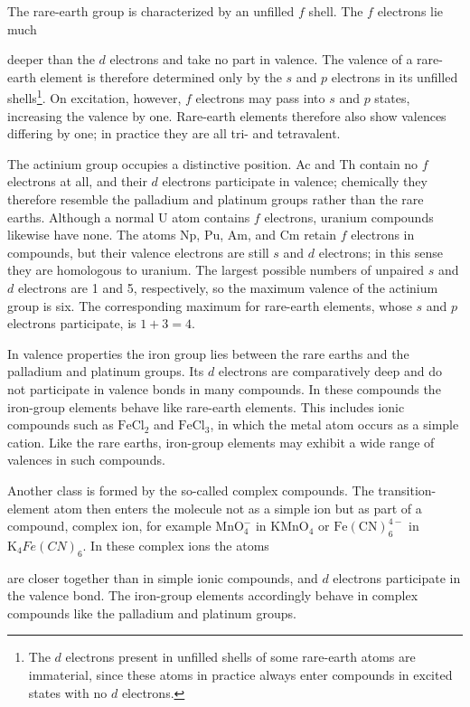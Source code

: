 The rare-earth group is characterized by an unfilled $f$ shell. The $f$ electrons lie much

deeper than the $d$ electrons and take no part in valence. The valence of a rare-earth element is therefore determined only by the $s$ and $p$ electrons in its unfilled shells\footnote{The $d$ electrons present in unfilled shells of some rare-earth atoms are immaterial, since these atoms in practice always enter compounds in excited states with no $d$ electrons.}. On excitation, however, $f$ electrons may pass into $s$ and $p$ states, increasing the valence by one. Rare-earth elements therefore also show valences differing by one; in practice they are all tri- and tetravalent.

The actinium group occupies a distinctive position. Ac and Th contain no $f$ electrons at all, and their $d$ electrons participate in valence; chemically they therefore resemble the palladium and platinum groups rather than the rare earths. Although a normal U atom contains $f$ electrons, uranium compounds likewise have none. The atoms Np, Pu, Am, and Cm retain $f$ electrons in compounds, but their valence electrons are still $s$ and $d$ electrons; in this sense they are homologous to uranium. The largest possible numbers of unpaired $s$ and $d$ electrons are 1 and 5, respectively, so the maximum valence of the actinium group is six. The corresponding maximum for rare-earth elements, whose $s$ and $p$ electrons participate, is $1+3=4$.

In valence properties the iron group lies between the rare earths and the palladium and platinum groups. Its $d$ electrons are comparatively deep and do not participate in valence bonds in many compounds. In these compounds the iron-group elements behave like rare-earth elements. This includes ionic compounds such as $\mathrm{FeCl}_2$ and $\mathrm{FeCl}_3$, in which the metal atom occurs as a simple cation. Like the rare earths, iron-group elements may exhibit a wide range of valences in such compounds.

Another class is formed by the so-called complex compounds. The transition-element atom then enters the molecule not as a simple ion but as part of a compound, complex ion, for example $\mathrm{MnO}_4^-$ in $\mathrm{KMnO}_4$ or $\mathrm{Fe(CN)}_6^{4-}$ in $\mathrm K_4Fe(CN)_6$. In these complex ions the atoms

are closer together than in simple ionic compounds, and $d$ electrons participate in the valence bond. The iron-group elements accordingly behave in complex compounds like the palladium and platinum groups.

